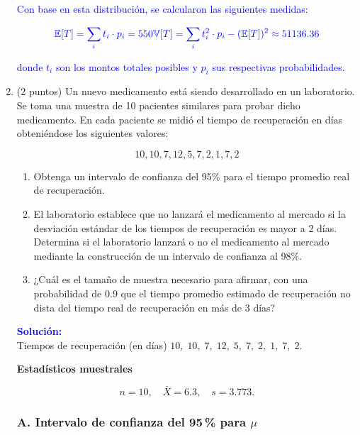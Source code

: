 \documentclass[12pt]{article}
\begin{document}
\begin{enumerate}
	      \textcolor{blue}{Con base en esta distribución, se calcularon las siguientes medidas:}

	      \[
		      \textcolor{blue}{\mathbb{E}[T] = \sum_i t_i \cdot p_i = 550} \\
		      \textcolor{blue}{\mathbb{V}[T] = \sum_i t_i^2 \cdot p_i - (\mathbb{E}[T])^2 \approx 51136.36}
	      \]

	      \textcolor{blue}{donde \(t_i\) son los montos totales posibles y \(p_i\) sus respectivas probabilidades.}

	\item (2 puntos) Un nuevo medicamento está siendo desarrollado en un laboratorio. Se toma una muestra de 10 pacientes similares para probar dicho medicamento. En cada paciente se midió el tiempo de recuperación en días obteniéndose los siguientes valores:

	      \[
		      10, 10, 7, 12, 5, 7, 2, 1, 7, 2
	      \]

	      \begin{enumerate}
		      \item Obtenga un intervalo de confianza del 95\% para el tiempo promedio real de
		            recuperación.
		      \item El laboratorio establece que no lanzará el medicamento al mercado si la
		            desviación estándar de los tiempos de recuperación es mayor a 2 días. Determina
		            si el laboratorio lanzará o no el medicamento al mercado mediante la
		            construcción de un intervalo de confianza al 98\%.
		      \item ¿Cuál es el tamaño de muestra necesario para afirmar, con una probabilidad de 0.9 que el tiempo promedio estimado de recuperación no dista del tiempo real de recuperación en más de 3 días?
	      \end{enumerate}
\begingroup\color{blue}

\textcolor{blue}{\textbf{Solución:}} \\
	Tiempos de recuperación (en días)
	\(10,\;10,\;7,\;12,\;5,\;7,\;2,\;1,\;7,\;2\).

\vspace{0.5em}
\textbf{Estadísticos muestrales}

\[
n = 10,
\quad
\bar X = 6.3,
\quad
s = 3.773.
\]

\subsubsection*{A. Intervalo de confianza del 95\,\% para \(\mu\)}


\end{enumerate}
\end{document}
